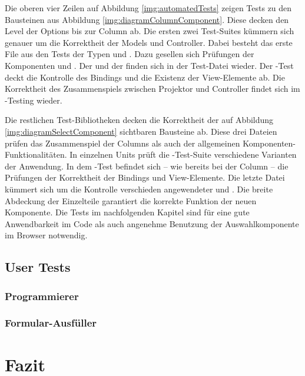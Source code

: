 Die oberen vier Zeilen auf Abbildung \ref{img:automatedTests} zeigen Tests zu den Bausteinen aus Abbildung \ref{img:diagramColumnComponent}. 
Diese decken den Level der Options bis zur Column ab.
Die ersten zwei Test-Suites kümmern sich genauer um die Korrektheit der Models und Controller. 
Dabei besteht das erste File aus den Tests der Typen  und . 
Dazu gesellen sich Prüfungen der Komponenten  und .
Der  und der  finden sich in der Test-Datei wieder.
Der -Test deckt die Kontrolle des Bindings und die Existenz der View-Elemente ab.
Die Korrektheit des Zusammenspiels zwischen Projektor und Controller findet sich im -Testing wieder.

Die restlichen Test-Bibliotheken decken die Korrektheit der auf Abbildung \ref{img:diagramSelectComponent} sichtbaren Bausteine ab. 
Diese drei Dateien prüfen das Zusammenspiel der Columns als auch der allgemeinen Komponenten-Funktionalitäten. 
In einzelnen Units prüft die -Test-Suite verschiedene Varianten der Anwendung.
In dem -Test befindet sich – wie bereits bei der Column – die Prüfungen der Korrektheit der Bindings und View-Elemente. 
Die letzte Datei kümmert sich um die Kontrolle verschieden angewendeter  und . 
Die breite Abdeckung der Einzelteile garantiert die korrekte Funktion der neuen Komponente.
Die Tests im nachfolgenden Kapitel sind für eine gute Anwendbarkeit im Code als auch angenehme Benutzung der Auswahlkomponente im Browser notwendig. 


\subsection{User Tests} %
\label{sec:userTests}


\subsubsection{Programmierer}
\label{sec:userTestsProgrammer}


\subsubsection{Formular-Ausfüller}
\label{sec:userTestsEnduser}



\section{Fazit}
\label{sec:summeryNew}

